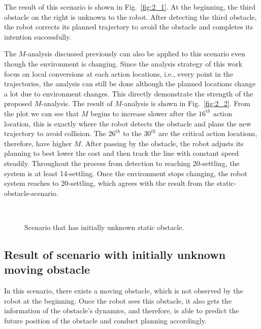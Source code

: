 \documentclass[letterpaper, 10 pt, conference]{ieeeconf}  %
\begin{document}
The result of this scenario is shown in Fig.~\ref{fig:2_1}. At the beginning, the third obstacle on the right is unknown to the robot. After detecting the third obstacle, the robot corrects its planned trajectory to avoid the obstacle and completes its intention successfully.

The $M$-analysis discussed previously can also be applied to this scenario even though the environment is changing. Since the analysis strategy of this work focus on local conversions at each action locations, i.e., every point in the trajectories, the analysis can still be done although the planned locations change a lot due to environment changes. This directly demonstrate the strength of the proposed $M$-analysis. The result of $M$-analysis is shown in Fig.~\ref{fig:2_2}. From the plot we can see that $M$ begins to increase slower after the $16^{th}$ action location, this is exactly where the robot detects the obstacle and plans the new trajectory to avoid collision. The $26^{th}$ to the $30^{th}$ are the critical action locations, therefore, have higher $M$. After passing by the obstacle, the robot adjusts its planning to best lower the cost and then track the line with constant speed steadily. Throughout the process from detection to reaching 20-settling, the system is at least 14-settling. Once the environment stops changing, the robot system reaches to 20-settling, which agrees with the result from the static-obstacle-scenario.     




\begin{figure}[t]
      \centering
      \\
      
      \caption{Scenario that has initially unknown static obstacle.}
      
\end{figure}





\subsection{Result of scenario with initially unknown moving obstacle}
In this scenario, there exists a moving obstacle, which is not observed by the robot at the beginning. Once the robot sees this obstacle, it also gets the information of the obstacle's dynamics, and therefore, is able to predict the future position of the obstacle and conduct planning accordingly. 
\end{document}
